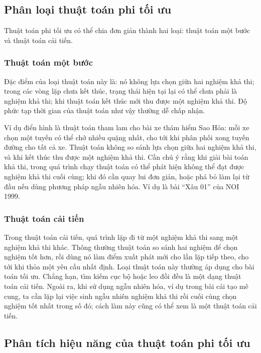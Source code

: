 \documentclass[11pt]{article}
\begin{document}
\subsection{Phân loại thuật toán phi tối ưu}

Thuật toán phi tối ưu có thể chia đơn giản thành hai loại: thuật toán một bước
và thuật toán cải tiến.

\subsubsection{Thuật toán một bước}

Đặc điểm của loại thuật toán này là: nó không lựa chọn giữa hai nghiệm khả
thi; trong các vòng lặp chưa kết thúc, trạng thái hiện tại lại có thể chưa
phải là nghiệm khả thi; khi thuật toán kết thúc mới thu được một nghiệm khả
thi. Độ phức tạp thời gian của thuật toán như vậy thường dễ chấp nhận.

Ví dụ điển hình là thuật toán tham lam cho bài xe thám hiểm Sao Hỏa: mỗi xe
chọn một tuyến có thể chở nhiều quặng nhất, cho tới khi phân phối xong tuyến
đường cho tất cả xe. Thuật toán không so sánh lựa chọn giữa hai nghiệm khả
thi, và khi kết thúc thu được một nghiệm khả thi. Cần chú ý rằng khi giải bài
toán khả thi, trong quá trình chạy thuật toán có thể phát hiện không thể đạt
được nghiệm khả thi cuối cùng; khi đó cần quay lui đơn giản, hoặc phá bỏ làm
lại từ đầu nếu dùng phương pháp ngẫu nhiên hóa. Ví dụ là bài ``Xâu 01'' của
NOI 1999.

\subsubsection{Thuật toán cải tiến}

Trong thuật toán cải tiến, quá trình lặp đi từ một nghiệm khả thi sang một
nghiệm khả thi khác. Thông thường thuật toán so sánh hai nghiệm để chọn nghiệm
tốt hơn, rồi dùng nó làm điểm xuất phát mới cho lần lặp tiếp theo, cho tới khi
thỏa một yêu cầu nhất định. Loại thuật toán này thường áp dụng cho bài toán
tối ưu. Chẳng hạn, tìm kiếm cục bộ hoặc leo đồi đều là một dạng thuật toán cải
tiến. Ngoài ra, khi sử dụng ngẫu nhiên hóa, ví dụ trong bài cải tạo mê cung,
ta cần lặp lại việc sinh ngẫu nhiên nghiệm khả thi rồi cuối cùng chọn nghiệm
tốt nhất trong số đó; cách làm này cũng có thể xem là một thuật toán cải tiến.

\subsection{Phân tích hiệu năng của thuật toán phi tối ưu}
\end{document}
